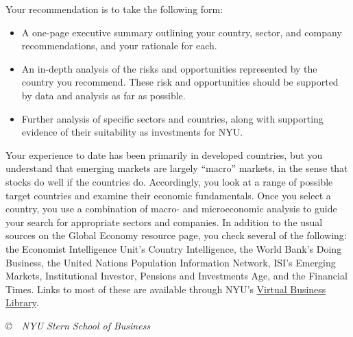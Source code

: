 \documentclass[letterpaper,12pt]{article}
\begin{document}
Your recommendation is to take the following form:   
%
\begin{itemize}%

\item A one-page executive summary outlining your country, 
sector, and company recommendations, and your rationale for each.  

\item An in-depth analysis of the risks and opportunities 
represented by the country you recommend.  
These risk and opportunities should be supported by 
data and analysis as far as possible.  

\item Further analysis of specific sectors and countries, 
along with supporting evidence of their suitability
as investments for NYU.  

\end{itemize}
%
Your experience to date has been primarily in developed countries, 
but you understand that emerging markets are largely ``macro'' markets, 
in the sense that stocks do well if the countries do.  
Accordingly, you look at a range of possible target countries 
and examine their economic fundamentals.  
Once you select a country, you use a combination
of macro- and microeconomic analysis  
to guide your search for appropriate sectors and companies.   
In addition to the usual sources on the Global Economy 
{resource page},
you check several of the following:  
the Economist Intelligence Unit's 
{Country Intelligence},
the World Bank's 
{Doing Business},  
the United Nations Population Information Network, 
ISI's %
{Emerging Markets}, 
Institutional Investor, 
Pensions and Investments Age, 
and the Financial Times.  
Links to most of these are available through NYU's 
\href{http://library.nyu.edu/vbl/}
{Virtual Business Library}.


\vfill \centerline{\it \copyright \ \number\year \  
NYU Stern School of Business}
\end{document}
